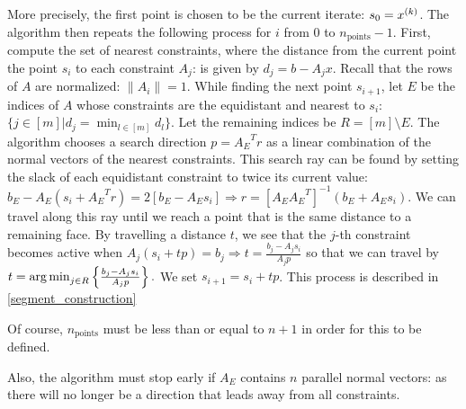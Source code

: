 More precisely, the first point is chosen to be the current iterate: $s_0 = x^{(k)}$.
The algorithm then repeats the following process for $i$ from $0$ to $n_{\text{points}}-1$.
First, compute the set of nearest constraints, where the distance from the current point the point $s_i$ to each constraint $A_j$: 
is given by $d_j = b - A_j x$.
Recall that the rows of $A$ are normalized: $\left\|A_i\right\| = 1$.
While finding the next point $s_{i+1}$, let  $E$ be the indices of $A$ whose constraints are the equidistant and nearest to $s_i$:
$\{j \in [m] | d_j = \min_{l \in [m]} d_l\}$.
Let the remaining indices be $R = [m] \setminus E$.
The algorithm chooses a search direction $p = {A_E}^Tr$ as a linear combination of the normal vectors of the nearest constraints.
This search ray can be found by setting the slack of each equidistant constraint to twice its current value:
$ b_E - A_E(s_i + {A_E}^Tr) = 2 \left[b_E - A_Es_i\right] \Longrightarrow r = \left[A_E{A_E}^T\right]^{-1}\left(b_E + A_E s_i\right)$.
We can travel along this ray until we reach a point that is the same distance to a remaining face.
By travelling a distance $t$, we see that the $j$-th constraint becomes active when
$A_j (s_i + t p) = b_j \Longrightarrow t = \frac{b_j - A_j s_i}{A_jp}$
so that we can travel by 
$t = \operatorname*{arg\,min}_{j \in R} \left\{\frac{b_j - A_j s_i}{A_jp}  \right\}. $
We set $s_{i+1} = s_{i} + t p$.
This process is described in \cref{segment_construction}

Of course, $n_{\text{points}}$ must be less than or equal to $n + 1$ in order for this to be defined.
\begin{boxedcomment}
Also, the algorithm must stop early if $A_E$ contains $n$ parallel normal vectors: 
as there will no longer be a direction that leads away from all constraints.
\end{boxedcomment}


